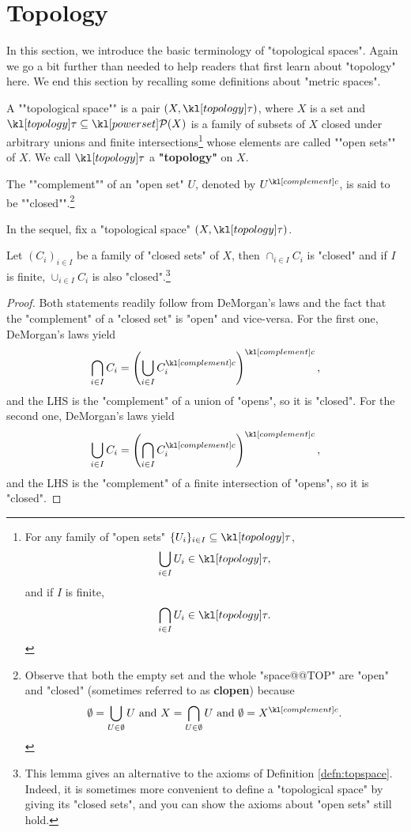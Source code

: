 \documentclass[main.tex]{subfiles}
\begin{document}
\section{Topology}
In this section, we introduce the basic terminology of "topological spaces". Again we go a bit further than needed to help readers that first learn about "topology" here. We end this section by recalling some definitions about "metric spaces". 
\begin{defn}\label{defn:topspace}
	\AP A ""topological space"" is a pair $(X, \topo)$, where $X$ is a set and $\topo\subseteq \mP(X)$ is a family of subsets of $X$ closed under arbitrary unions and finite intersections\footnote{For any family of "open sets" $\{U_i\}_{i \in I}\subseteq \topo$,\[\bigcup_{i \in I} U_i \in \topo,\] and if $I$ is finite,\[\bigcap_{i \in I} U_i \in \topo.\]} whose elements are called ""open sets"" of $X$. We call $\topo$ a \textbf{"topology"} on $X$.
	
	\AP The ""complement"" of an "open set" $U$, denoted by $U^\comple$, is said to be ""closed"".\footnote{Observe that both the empty set and the whole "space@@TOP" are "open" and "closed" (sometimes referred to as \textbf{clopen}) because 
	\[\emptyset = \bigcup_{U \in \emptyset} U \text{ and } X = \bigcap_{U \in \emptyset} U \text { and } \emptyset = X^\comple.\]}
\end{defn}
In the sequel, fix a "topological space" $(X,\topo)$.
\begin{prop}
	Let $(C_i)_{i \in I}$ be a family of "closed sets" of $X$, then $\cap_{i \in I} C_i$ is "closed" and if $I$ is finite, $\cup_{i \in I} C_i$ is also "closed".\footnote{This lemma gives an alternative to the axioms of Definition \ref{defn:topspace}. Indeed, it is sometimes more convenient to define a "topological space" by giving its "closed sets", and you can show the axioms about "open sets" still hold.}
\end{prop}
\begin{proof}
	Both statements readily follow from DeMorgan's laws and the fact that the "complement" of a "closed set" is "open" and vice-versa. For the first one, DeMorgan's laws yield
	\[\bigcap_{i \in I} C_i =  \left( \bigcup_{i \in I} C_i^\comple \right)^\comple,\]
	and the LHS is the "complement" of a union of "opens", so it is "closed". For the second one, DeMorgan's laws yield
	\[\bigcup_{i \in I} C_i =  \left( \bigcap_{i \in I} C_i^\comple \right)^\comple,\]
	and the LHS is the "complement" of a finite intersection of "opens", so it is "closed".
\end{proof}
\end{document}
